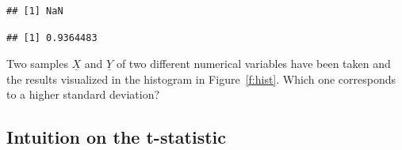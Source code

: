 \begin{knitrout}
\color{fgcolor}\begin{kframe}
\begin{alltt}
 \hlkwb{<-} 
 \hlkwb{<-} 
\hldef{(} \hlopt{-} \hlopt{/} \hlopt{-} \hldef{) )}
\end{alltt}


{\ttfamily\noindent\color{warningcolor}{\#\# Warning in sqrt(sum(X - mean(X))/(sample\_size - 1)): Si è prodotto un NaN}}\begin{verbatim}
## [1] NaN
\end{verbatim}
\begin{alltt}
\end{alltt}
\begin{verbatim}
## [1] 0.9364483
\end{verbatim}
\begin{alltt}
\end{alltt}
\end{kframe}
\end{knitrout}


	\begin{ExerciseList}
      		\Exercise Two samples $ \underline X$ and $\underline Y$ of two different numerical variables have been taken and the results visualized in  the histogram in Figure~\ref{f:hist}. Which one corresponds to a higher standard deviation? 
      	\end{ExerciseList}

      	\subsection{Intuition on the t-statistic}

